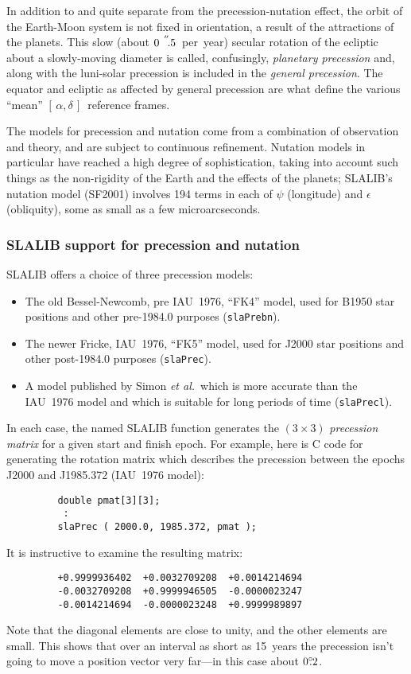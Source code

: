 \documentclass[11pt,fleqn,twoside]{article}
\renewcommand{\_}{{\tt\char'137}}     %
\newcommand{\radec}     {$[\,\alpha,\delta\,]$}
\newcommand{\degree}[2] {$#1^{\circ}
                        \hspace{-0.37em}.\hspace{0.02em}#2$}
\newcommand{\arcseci}[1] {$#1\hspace{0.05em}$\raisebox{-0.5ex}
                         {$^{'\hspace{-0.1em}'\hspace{0.0em}}$}}
\newcommand{\arcsec}[2] {\arcseci{#1}$\hspace{-0.35em}.#2$}
\begin{document}
In addition to and quite separate
from the precession-nutation effect, the orbit of the Earth-Moon system
is not fixed in orientation, a result of the attractions of the
planets.  This slow (about \arcsec{0}{5}~per~year)
secular rotation of the ecliptic about a slowly-moving diameter is called,
confusingly, {\it planetary
precession}\/ and, along with the luni-solar precession is
included in the {\it general precession}.  The equator and
ecliptic as affected by general precession
are what define the various ``mean'' \radec\ reference frames.

The models for precession and nutation come from a combination
of observation and theory, and are subject to continuous
refinement.  Nutation models in particular have reached a high
degree of sophistication, taking into account such things as
the non-rigidity of the Earth and the effects of
the planets; SLALIB's nutation
model (SF2001) involves 194 terms in each of $\psi$ (longitude)
and $\epsilon$ (obliquity), some as small as a few microarcseconds.

\subsubsection{SLALIB support for precession and nutation}
SLALIB offers a choice of three precession models:
\begin{itemize}
\item The old Bessel-Newcomb, pre IAU~1976, ``FK4'' model, used for B1950
      star positions and other pre-1984.0 purposes
({\tt slaPrebn}).
\item The newer Fricke, IAU~1976, ``FK5'' model, used for J2000 star
      positions and other post-1984.0 purposes
({\tt slaPrec}).
\item A model published by Simon {\it et al.}\ which is more accurate than
      the IAU~1976 model and which is suitable for long
      periods of time
({\tt slaPrecl}).
\end{itemize}
In each case, the named SLALIB function generates the $(3\times3)$
{\it precession
matrix}\/ for a given start and finish epoch.  For example,
here is C code for generating the rotation
matrix which describes the precession between the epochs
J2000 and J1985.372 (IAU~1976 model):
\goodbreak
\vspace{-3ex}
\begin{verbatim}
         double pmat[3][3];
          :
         slaPrec ( 2000.0, 1985.372, pmat );
\end{verbatim}
\vspace{-3ex}
\goodbreak
It is instructive to examine the resulting matrix:
\goodbreak
\vspace{-3ex}
\begin{verbatim}
         +0.9999936402  +0.0032709208  +0.0014214694
         -0.0032709208  +0.9999946505  -0.0000023247
         -0.0014214694  -0.0000023248  +0.9999989897
\end{verbatim}
\vspace{-3ex}
\goodbreak
Note that the diagonal elements are close to unity, and the
other elements are small.  This shows that over an interval as
short as 15~years the precession isn't going to move a
position vector very far---in this case about \degree{0}{2}.
 
\end{document}
